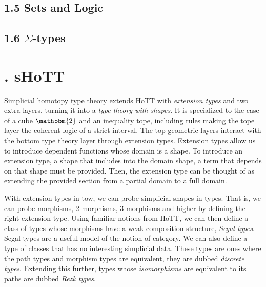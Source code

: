 \documentclass{article}
\theoremstyle{named}
\theoremstyle{remark}
\theoremstyle{definition}
\begin{document}
\subsection*{1.5 Sets and Logic}


\subsection*{1.6 $\Sigma$-types}


\newpage

\section*{. sHoTT}
\setcounter{section}{2}
\setcounter{equation}{0}
\setcounter{theorem}{0}
\setcounter{subsection}{1}

Simplicial homotopy type theory extends HoTT with \textit{extension types} and two extra layers, turning it into a
 \textit{type theory with shapes}. It is specialized to the case of a cube $\mathbbm{2}$ and an inequality tope, including rules making the tope layer the coherent logic of a strict interval. The top geometric layers interact with the bottom type theory layer
 through extension types. Extension types allow us to introduce dependent functions whose domain is a shape. To introduce an extension type, a shape that includes into the domain shape, a term that depends on that shape must be provided. Then, the extension
 type can be thought of as extending the provided section from a partial domain to a full domain. 

 With extension types in tow, we can probe simplicial shapes in types. That is, we can probe morphisms, 2-morphisms, 3-morphisms and higher by defining the right extension type. Using familiar notions from HoTT, we can then define a class of types whose morphisms have a weak composition structure, \textit{Segal types}. Segal types are a useful model of the notion of category. We can also define a type of classes that has no interesting simplicial data. These types are ones where the path types and morphism types are equivalent, they are dubbed \textit{discrete types}. Extending this further, types whose \textit{isomorphisms} are equivalent to its paths are dubbed \textit{Rezk types}. 
\end{document}
